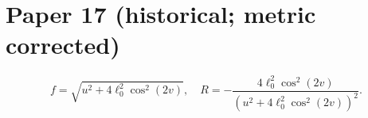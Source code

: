 \documentclass[11pt]{article}
\begin{document}
\section*{Paper 17 (historical; metric corrected)}
\[
f=\sqrt{u^2+4\ell_0^2\cos^2(2v)},\quad
R=-\frac{4\ell_0^2\cos^2(2v)}{(u^2+4\ell_0^2\cos^2(2v))^2}.
\]
\end{document}
